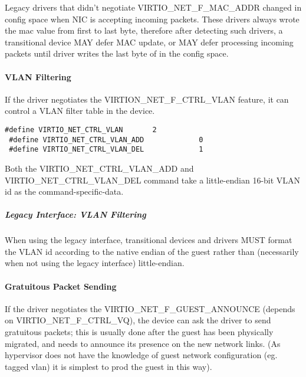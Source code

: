 Legacy drivers that didn't negotiate VIRTIO_NET_F_MAC_ADDR
changed  in config space when NIC is accepting
incoming packets. These drivers always wrote the mac value from
first to last byte, therefore after detecting such drivers,
a transitional device MAY defer MAC update, or MAY defer
processing incoming packets until driver writes the last byte
of  in the config space.

\paragraph{VLAN Filtering}\label{sec:Device Types / Network Device / Device Operation / Control Virtqueue / VLAN Filtering}

If the driver negotiates the VIRTION_NET_F_CTRL_VLAN feature, it
can control a VLAN filter table in the device.

\begin{lstlisting}
#define VIRTIO_NET_CTRL_VLAN       2
 #define VIRTIO_NET_CTRL_VLAN_ADD             0
 #define VIRTIO_NET_CTRL_VLAN_DEL             1
\end{lstlisting}

Both the VIRTIO_NET_CTRL_VLAN_ADD and VIRTIO_NET_CTRL_VLAN_DEL
command take a little-endian 16-bit VLAN id as the command-specific-data.

\subparagraph{Legacy Interface: VLAN Filtering}\label{sec:Device Types / Network Device / Device Operation / Control Virtqueue / VLAN Filtering / Legacy Interface: VLAN Filtering}
When using the legacy interface, transitional devices and drivers
MUST format the VLAN id
according to the native endian of the guest rather than
(necessarily when not using the legacy interface) little-endian.

\paragraph{Gratuitous Packet Sending}\label{sec:Device Types / Network Device / Device Operation / Control Virtqueue / Gratuitous Packet Sending}

If the driver negotiates the VIRTIO_NET_F_GUEST_ANNOUNCE (depends
on VIRTIO_NET_F_CTRL_VQ), the device can ask the driver to send gratuitous
packets; this is usually done after the guest has been physically
migrated, and needs to announce its presence on the new network
links. (As hypervisor does not have the knowledge of guest
network configuration (eg. tagged vlan) it is simplest to prod
the guest in this way).

